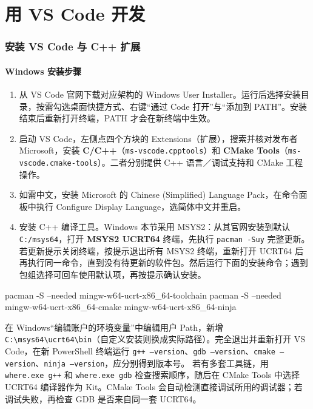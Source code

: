 \section{用 VS Code 开发}
\label{sec:ide-vscode}
\subsubsection{安装 VS Code 与 C++ 扩展}
\paragraph*{Windows 安装步骤}
\begin{enumerate}
\item 从 VS Code 官网下载对应架构的 Windows User Installer。运行后选择安装目录，按需勾选桌面快捷方式、右键“通过 Code 打开”与“添加到 PATH”。安装结束后重新打开终端，PATH 才会在新终端中生效。
\item 启动 VS Code，左侧点四个方块的 Extensions（扩展），搜索并核对发布者 Microsoft，安装 \textbf{C/C++}（\texttt{ms-vscode.cpptools}）和 \textbf{CMake Tools}（\texttt{ms-vscode.cmake-tools}）。二者分别提供 C++ 语言／调试支持和 CMake 工程操作。
\item 如需中文，安装 Microsoft 的 Chinese (Simplified) Language Pack，在命令面板中执行 Configure Display Language，选简体中文并重启。
\item 安装 C++ 编译工具。Windows 本节采用 MSYS2：从其官网安装到默认 \texttt{C:/msys64}，打开 \textbf{MSYS2 UCRT64} 终端，先执行 \texttt{pacman -Suy} 完整更新。若更新提示关闭终端，按提示退出所有 MSYS2 终端，重新打开 UCRT64 后再执行同一命令，直到没有待更新的软件包。然后运行下面的安装命令；遇到包组选择可回车使用默认项，再按提示确认安装。
\end{enumerate}


\begin{tbash}
pacman -S --needed mingw-w64-ucrt-x86_64-toolchain
pacman -S --needed mingw-w64-ucrt-x86_64-cmake mingw-w64-ucrt-x86_64-ninja
\end{tbash}


在 Windows“编辑账户的环境变量”中编辑用户 Path，新增 \texttt{C:\textbackslash msys64\textbackslash ucrt64\textbackslash bin}（自定义安装则换成实际路径）。完全退出并重新打开 VS Code，在新 PowerShell 终端运行 \texttt{g++ --version}、\texttt{gdb --version}、\texttt{cmake --version}、\texttt{ninja --version}，应分别得到版本号。
若有多套工具链，用 \texttt{where.exe g++} 和 \texttt{where.exe gdb} 检查搜索顺序，随后在 CMake Tools 中选择 UCRT64 编译器作为 Kit。CMake Tools 会自动检测直接调试所用的调试器；若调试失败，再检查 GDB 是否来自同一套 UCRT64。


